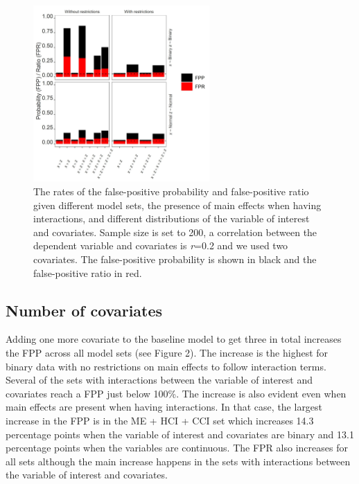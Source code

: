 \begin{figure}[hbt!]
\includegraphics[width=0.6\textwidth]{R/Analysis/Result/Figures/Figure1A.jpeg}
\centering
\caption{The rates of the false-positive probability and false-positive ratio given different model sets, the presence of main effects when having interactions, and different distributions of the variable of interest and covariates. Sample size is set to 200, a correlation between the dependent variable and covariates is \textit{r}=0.2 and we used two covariates. The false-positive probability is shown in black and the false-positive ratio in red.}
\label{fig:mainfigure}
\end{figure}

\subsection{Number of covariates}
Adding one more covariate to the baseline model to get three in total increases the FPP across all model sets (see Figure 2). The increase is the highest for binary data with no restrictions on main effects to follow interaction terms. Several of the sets with interactions between the variable of interest and covariates reach a FPP just below 100\%. The increase is also evident even when main effects are present when having interactions. In that case, the largest increase in the FPP is in the ME + HCI + CCI set which increases 14.3 percentage points when the variable of interest and covariates are binary and 13.1 percentage points when the variables are continuous. The FPR also increases for all sets although the main increase happens in the sets with interactions between the variable of interest and covariates. 

